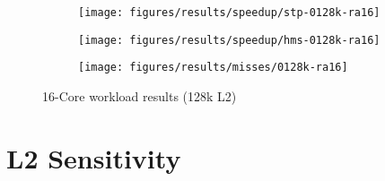\begin{figure}
    \centering
    \begin{subfigure}[b]{\textwidth}
            \texttt{[image: figures/results/speedup/stp-0128k-ra16]}
            \label{fig:results:4core:hms:random}
    \end{subfigure}

    \begin{subfigure}[b]{\textwidth}
            \texttt{[image: figures/results/speedup/hms-0128k-ra16]}
            \label{fig:results:4core:hms:cache}
    \end{subfigure}
    \begin{subfigure}[b]{\textwidth}
            \texttt{[image: figures/results/misses/0128k-ra16]}
            \label{fig:results:4core:hms:cache-bw}
    \end{subfigure}

    \caption{16-Core workload results (128k L2)}\label{fig:results:4core:hms}
\end{figure}


\section{L2 Sensitivity}


